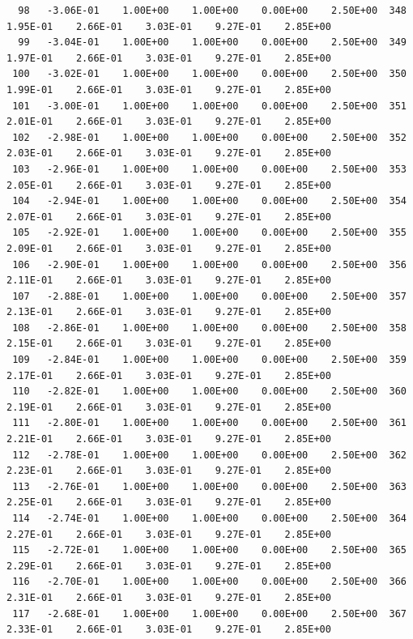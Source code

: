 \documentclass[10pt,letterpaper,notitlepage]{article}
\numberwithin{equation}{section}
\begin{document}
\begin{appendices}
{\begin{verbatim}
  98   -3.06E-01    1.00E+00    1.00E+00    0.00E+00    2.50E+00  348    1.95E-01    2.66E-01    3.03E-01    9.27E-01    2.85E+00
  99   -3.04E-01    1.00E+00    1.00E+00    0.00E+00    2.50E+00  349    1.97E-01    2.66E-01    3.03E-01    9.27E-01    2.85E+00
 100   -3.02E-01    1.00E+00    1.00E+00    0.00E+00    2.50E+00  350    1.99E-01    2.66E-01    3.03E-01    9.27E-01    2.85E+00
 101   -3.00E-01    1.00E+00    1.00E+00    0.00E+00    2.50E+00  351    2.01E-01    2.66E-01    3.03E-01    9.27E-01    2.85E+00
 102   -2.98E-01    1.00E+00    1.00E+00    0.00E+00    2.50E+00  352    2.03E-01    2.66E-01    3.03E-01    9.27E-01    2.85E+00
 103   -2.96E-01    1.00E+00    1.00E+00    0.00E+00    2.50E+00  353    2.05E-01    2.66E-01    3.03E-01    9.27E-01    2.85E+00
 104   -2.94E-01    1.00E+00    1.00E+00    0.00E+00    2.50E+00  354    2.07E-01    2.66E-01    3.03E-01    9.27E-01    2.85E+00
 105   -2.92E-01    1.00E+00    1.00E+00    0.00E+00    2.50E+00  355    2.09E-01    2.66E-01    3.03E-01    9.27E-01    2.85E+00
 106   -2.90E-01    1.00E+00    1.00E+00    0.00E+00    2.50E+00  356    2.11E-01    2.66E-01    3.03E-01    9.27E-01    2.85E+00
 107   -2.88E-01    1.00E+00    1.00E+00    0.00E+00    2.50E+00  357    2.13E-01    2.66E-01    3.03E-01    9.27E-01    2.85E+00
 108   -2.86E-01    1.00E+00    1.00E+00    0.00E+00    2.50E+00  358    2.15E-01    2.66E-01    3.03E-01    9.27E-01    2.85E+00
 109   -2.84E-01    1.00E+00    1.00E+00    0.00E+00    2.50E+00  359    2.17E-01    2.66E-01    3.03E-01    9.27E-01    2.85E+00
 110   -2.82E-01    1.00E+00    1.00E+00    0.00E+00    2.50E+00  360    2.19E-01    2.66E-01    3.03E-01    9.27E-01    2.85E+00
 111   -2.80E-01    1.00E+00    1.00E+00    0.00E+00    2.50E+00  361    2.21E-01    2.66E-01    3.03E-01    9.27E-01    2.85E+00
 112   -2.78E-01    1.00E+00    1.00E+00    0.00E+00    2.50E+00  362    2.23E-01    2.66E-01    3.03E-01    9.27E-01    2.85E+00
 113   -2.76E-01    1.00E+00    1.00E+00    0.00E+00    2.50E+00  363    2.25E-01    2.66E-01    3.03E-01    9.27E-01    2.85E+00
 114   -2.74E-01    1.00E+00    1.00E+00    0.00E+00    2.50E+00  364    2.27E-01    2.66E-01    3.03E-01    9.27E-01    2.85E+00
 115   -2.72E-01    1.00E+00    1.00E+00    0.00E+00    2.50E+00  365    2.29E-01    2.66E-01    3.03E-01    9.27E-01    2.85E+00
 116   -2.70E-01    1.00E+00    1.00E+00    0.00E+00    2.50E+00  366    2.31E-01    2.66E-01    3.03E-01    9.27E-01    2.85E+00
 117   -2.68E-01    1.00E+00    1.00E+00    0.00E+00    2.50E+00  367    2.33E-01    2.66E-01    3.03E-01    9.27E-01    2.85E+00

\end{verbatim}}
\end{appendices}
\end{document}
